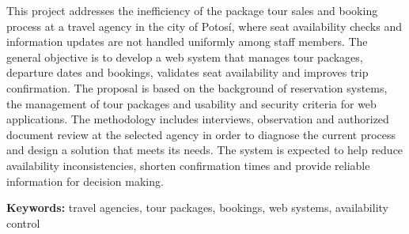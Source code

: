 
\noindent
This project addresses the inefficiency of the package tour sales and
booking process at a travel agency in the city of Potosí, where seat
availability checks and information updates are not handled uniformly among
staff members. The general objective is to develop a web system that
manages tour packages, departure dates and bookings, validates seat
availability and improves trip confirmation. The proposal is based on the
background of reservation systems, the management of tour packages and
usability and security criteria for web applications. The methodology
includes interviews, observation and authorized document review at the
selected agency in order to diagnose the current process and design a
solution that meets its needs. The system is expected to help reduce
availability inconsistencies, shorten confirmation times and provide
reliable information for decision making.

\vspace{0.5\baselineskip}
\noindent\textbf{Keywords:} travel agencies, tour packages, bookings, web
systems, availability control
